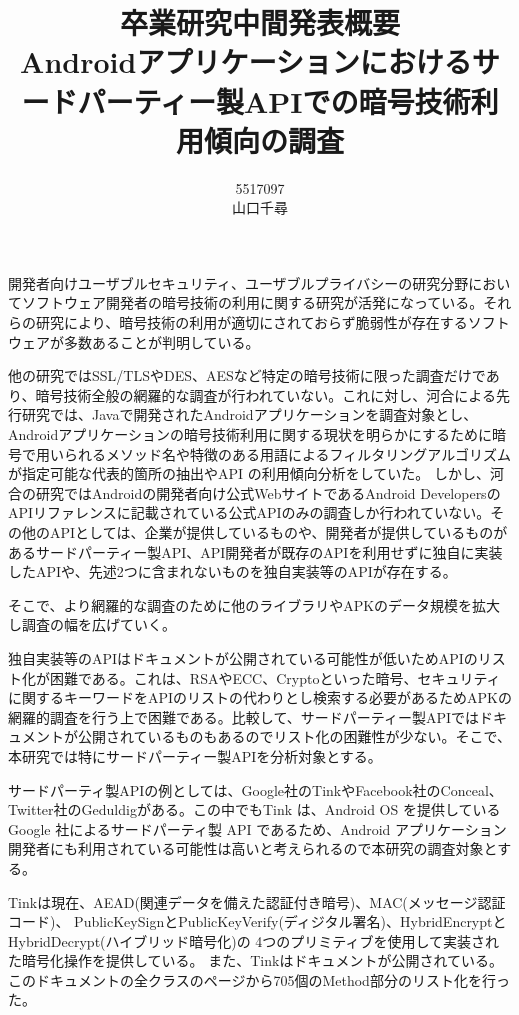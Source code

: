 \documentclass[twocolumn, 10pt, a4paper]{jarticle}
\title{\vspace{-3cm}
{\large 卒業研究中間発表概要}\\
{\bf
Androidアプリケーションにおけるサードパーティー製APIでの暗号技術利用傾向の調査
}
}
\author{
5517097 \\		%
山口千尋		%
}
\date{}
\begin{document}
\maketitle
\thispagestyle{empty}

開発者向けユーザブルセキュリティ、ユーザブルプライバシーの研究分野においてソフトウェア開発者の暗号技術の利用に関する研究が活発になっている。それらの研究により、暗号技術の利用が適切にされておらず脆弱性が存在するソフトウェアが多数あることが判明している。

他の研究ではSSL/TLSやDES、AESなど特定の暗号技術に限った調査だけであり、暗号技術全般の網羅的な調査が行われていない。これに対し、河合による先行研究\cite{Kawai}では、Javaで開発されたAndroidアプリケーションを調査対象とし、Androidアプリケーションの暗号技術利用に関する現状を明らかにするために暗号で用いられるメソッド名や特徴のある用語によるフィルタリングアルゴリズムが指定可能な代表的箇所の抽出やAPI の利用傾向分析をしていた。
しかし、河合の研究ではAndroidの開発者向け公式WebサイトであるAndroid Developers\cite{Android_Developers}のAPIリファレンスに記載されている公式APIのみの調査しか行われていない。その他のAPIとしては、企業が提供しているものや、開発者が提供しているものがあるサードパーティー製API、API開発者が既存のAPIを利用せずに独自に実装したAPIや、先述2つに含まれないものを独自実装等のAPIが存在する。

そこで、より網羅的な調査のために他のライブラリやAPKのデータ規模を拡大し調査の幅を広げていく。

独自実装等のAPIはドキュメントが公開されている可能性が低いためAPIのリスト化が困難である。これは、RSAやECC、Cryptoといった暗号、セキュリティに関するキーワードをAPIのリストの代わりとし検索する必要があるためAPKの網羅的調査を行う上で困難である。比較して、サードパーティー製APIではドキュメントが公開されているものもあるのでリスト化の困難性が少ない。そこで、本研究では特にサードパーティー製APIを分析対象とする。

サードパーティ製APIの例としては、Google社のTink\cite{Tink}やFacebook社のConceal\cite{Conceal}、Twitter社のGeduldig\cite{Geduldig}がある。この中でもTink は、Android OS を提供している Google 社によるサードパーティ製 API であるため、Android
アプリケーション開発者にも利用されている可能性は高いと考えられるので本研究の調査対象とする。

Tinkは現在、AEAD(関連データを備えた認証付き暗号)、MAC(メッセージ認証コード)、
PublicKeySignとPublicKeyVerify(ディジタル署名)、HybridEncryptとHybridDecrypt(ハイブリッド暗号化)の
4つのプリミティブを使用して実装された暗号化操作を提供している。
また、Tinkはドキュメントが公開されている。
このドキュメントの全クラスのページから705個のMethod部分のリスト化を行った。
\end{document}
